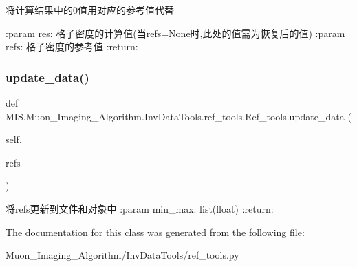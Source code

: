 \begin{DoxyVerb}将计算结果中的0值用对应的参考值代替

:param res: 格子密度的计算值(当refs=None时,此处的值需为恢复后的值)
:param refs: 格子密度的参考值
:return:
\end{DoxyVerb}
 \mbox{\label{classMIS_1_1Muon__Imaging__Algorithm_1_1InvDataTools_1_1ref__tools_1_1Ref__tools_adc58cff52c49c6937e2e1bb7489dcffa}} 
\subsubsection{\texorpdfstring{update\+\_\+data()}{update\_data()}}
{\footnotesize\ttfamily def M\+I\+S.\+Muon\+\_\+\+Imaging\+\_\+\+Algorithm.\+Inv\+Data\+Tools.\+ref\+\_\+tools.\+Ref\+\_\+tools.\+update\+\_\+data (\begin{DoxyParamCaption}\item[{}]{self,  }\item[{}]{refs }\end{DoxyParamCaption})}

\begin{DoxyVerb}将refs更新到文件和对象中
:param min_max: list(float)
:return:
\end{DoxyVerb}
 

The documentation for this class was generated from the following file\+:\begin{DoxyCompactItemize}
\item 
Muon\+\_\+\+Imaging\+\_\+\+Algorithm/\+Inv\+Data\+Tools/ref\+\_\+tools.\+py\end{DoxyCompactItemize}

